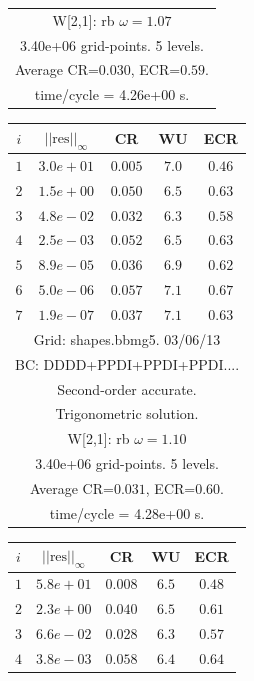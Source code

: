 \begin{table}[hbt]
\begin{center}
{\begin{tabular}{|c|c|c|c|c|}
\multicolumn{5}{|c|}{W[2,1]: rb $\omega=1.07$}  \\
\multicolumn{5}{|c|}{3.40e+06 grid-points. 5 levels.}  \\
\multicolumn{5}{|c|}{Average CR=$0.030$, ECR=$0.59$.}  \\
\multicolumn{5}{|c|}{time/cycle = 4.26e+00 s.}  \\
\hline 
\end{tabular}
\begin{tabular}{|c|c|c|c|c|} \hline 
 $i$   & $\vert\vert\mbox{res}\vert\vert_\infty$  &  CR     &  WU    & ECR  \\   \hline 
 $ 1$  & $ 3.0e+01$ & $0.005$ & $ 7.0$ & $0.46$ \\ 
 $ 2$  & $ 1.5e+00$ & $0.050$ & $ 6.5$ & $0.63$ \\ 
 $ 3$  & $ 4.8e-02$ & $0.032$ & $ 6.3$ & $0.58$ \\ 
 $ 4$  & $ 2.5e-03$ & $0.052$ & $ 6.5$ & $0.63$ \\ 
 $ 5$  & $ 8.9e-05$ & $0.036$ & $ 6.9$ & $0.62$ \\ 
 $ 6$  & $ 5.0e-06$ & $0.057$ & $ 7.1$ & $0.67$ \\ 
 $ 7$  & $ 1.9e-07$ & $0.037$ & $ 7.1$ & $0.63$ \\ 
\hline 
\multicolumn{5}{|c|}{Grid: shapes.bbmg5. 03/06/13}  \\
\multicolumn{5}{|c|}{BC: DDDD+PPDI+PPDI+PPDI....}  \\
\multicolumn{5}{|c|}{Second-order accurate.}  \\
\multicolumn{5}{|c|}{Trigonometric solution.}  \\
\multicolumn{5}{|c|}{W[2,1]: rb $\omega=1.10$}  \\
\multicolumn{5}{|c|}{3.40e+06 grid-points. 5 levels.}  \\
\multicolumn{5}{|c|}{Average CR=$0.031$, ECR=$0.60$.}  \\
\multicolumn{5}{|c|}{time/cycle = 4.28e+00 s.}  \\
\hline 
\end{tabular}
\begin{tabular}{|c|c|c|c|c|} \hline 
 $i$   & $\vert\vert\mbox{res}\vert\vert_\infty$  &  CR     &  WU    & ECR  \\   \hline 
 $ 1$  & $ 5.8e+01$ & $0.008$ & $ 6.5$ & $0.48$ \\ 
 $ 2$  & $ 2.3e+00$ & $0.040$ & $ 6.5$ & $0.61$ \\ 
 $ 3$  & $ 6.6e-02$ & $0.028$ & $ 6.3$ & $0.57$ \\ 
 $ 4$  & $ 3.8e-03$ & $0.058$ & $ 6.4$ & $0.64$ \\ 

\end{tabular}}
\end{center}
\end{table}
